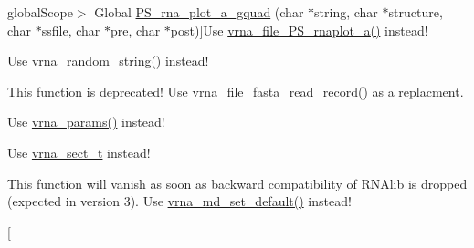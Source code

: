 \begin{DoxyRefList}
\hypertarget{deprecated__deprecated000121}{}%
global\+Scope$>$ Global \hyperlink{group__plotting__utils_ga32fa0f97625119e9d24dd2e7153abc4f}{P\+S\+\_\+rna\+\_\+plot\+\_\+a\+\_\+gquad} (char $\ast$string, char $\ast$structure, char $\ast$ssfile, char $\ast$pre, char $\ast$post)]Use \hyperlink{group__plotting__utils_ga139a31dd0ba9fc6612431f67de901c31}{vrna\+\_\+file\+\_\+\+P\+S\+\_\+rnaplot\+\_\+a()} instead!  
\item[\label{deprecated__deprecated000126}%
\hypertarget{deprecated__deprecated000126}{}%
global\+Scope$>$ Global \hyperlink{string__utils_8h_a1b95eac365a021572e1c37e5993a89be}{random\+\_\+string} (int l, const char symbols\mbox{[}\mbox{]})]Use \hyperlink{group__string__utils_ga4eeb3750dcf860b9f3158249f95dbd7f}{vrna\+\_\+random\+\_\+string()} instead!  
\item[\label{deprecated__deprecated000061}%
\hypertarget{deprecated__deprecated000061}{}%
global\+Scope$>$ Global \hyperlink{group__file__utils_gafd194a69af9d92b5b0412a7627ac1595}{read\+\_\+record} (char $\ast$$\ast$header, char $\ast$$\ast$sequence, char $\ast$$\ast$$\ast$rest, unsigned int options)]This function is deprecated! Use \hyperlink{group__file__utils_ga8cfb7e271efc9e1f34640acb85475639}{vrna\+\_\+file\+\_\+fasta\+\_\+read\+\_\+record()} as a replacment. 
\item[\label{deprecated__deprecated000090}%
\hypertarget{deprecated__deprecated000090}{}%
global\+Scope$>$ Global \hyperlink{group__energy__parameters_ga541f2cf7436e9bc939b0a49b24baf987}{scale\+\_\+parameters} (void)]Use \hyperlink{group__energy__parameters_gad0e3e7e74bdc50d1709d40c92993185e}{vrna\+\_\+params()} instead! 
\item[\label{deprecated__deprecated000045}%
\hypertarget{deprecated__deprecated000045}{}%
global\+Scope$>$ Global \hyperlink{group__data__structures_gaaacedee1f05d3d45aa6764eca51a8876}{sect} ]Use \hyperlink{group__data__structures_gacc9cdae790dac75a7024e7069c0d4400}{vrna\+\_\+sect\+\_\+t} instead!  
\item[\label{deprecated__deprecated000082}%
\hypertarget{deprecated__deprecated000082}{}%
global\+Scope$>$ Global \hyperlink{group__model__details_gabad896c3650d420f3f3ddefc69e2bceb}{set\+\_\+model\+\_\+details} (vrna\+\_\+md\+\_\+t $\ast$md)]This function will vanish as soon as backward compatibility of R\+N\+Alib is dropped (expected in version 3). Use \hyperlink{group__model__details_ga8ac6ff84936282436f822644bf841f66}{vrna\+\_\+md\+\_\+set\+\_\+default()} instead! 
\item[\label{deprecated__deprecated000150}%

\end{DoxyRefList}
